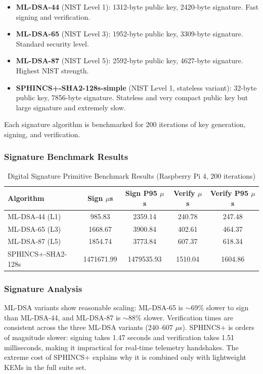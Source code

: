 \documentclass[conference]{IEEEtran}
\begin{document}
\begin{itemize}[leftmargin=*]
\item \textbf{ML-DSA-44} (NIST Level 1): 1312-byte public key, 2420-byte signature. Fast signing and verification.
\item \textbf{ML-DSA-65} (NIST Level 3): 1952-byte public key, 3309-byte signature. Standard security level.
\item \textbf{ML-DSA-87} (NIST Level 5): 2592-byte public key, 4627-byte signature. Highest NIST strength.
\item \textbf{SPHINCS+-SHA2-128s-simple} (NIST Level 1, stateless variant): 32-byte public key, 7856-byte signature. Stateless and very compact public key but large signature and extremely slow.
\end{itemize}

Each signature algorithm is benchmarked for 200 iterations of key generation, signing, and verification.

\subsubsection{Signature Benchmark Results}

\begin{table}[htbp]
\centering
\caption{Digital Signature Primitive Benchmark Results (Raspberry Pi 4, 200 iterations)}
\begin{tabular}{lcccc}
\toprule
\textbf{Algorithm} & \textbf{Sign $\mu$s} & \textbf{Sign P95 $\mu$s} & \textbf{Verify $\mu$s} & \textbf{Verify P95 $\mu$s} \\
\midrule
ML-DSA-44 (L1) & 985.83 & 2359.14 & 240.78 & 247.48 \\
ML-DSA-65 (L3) & 1668.67 & 3900.84 & 402.61 & 464.37 \\
ML-DSA-87 (L5) & 1854.74 & 3773.84 & 607.37 & 618.34 \\
SPHINCS+-SHA2-128s & 1471671.99 & 1479535.93 & 1510.04 & 1604.86 \\
\bottomrule
\end{tabular}
\end{table}

\subsubsection{Signature Analysis}

ML-DSA variants show reasonable scaling: ML-DSA-65 is $\sim$69\% slower to sign than ML-DSA-44, and ML-DSA-87 is $\sim$88\% slower. Verification times are consistent across the three ML-DSA variants (240–607 $\mu$s). SPHINCS+ is orders of magnitude slower: signing takes 1.47 seconds and verification takes 1.51 milliseconds, making it impractical for real-time telemetry handshakes. The extreme cost of SPHINCS+ explains why it is combined only with lightweight KEMs in the full suite set.
\end{document}
